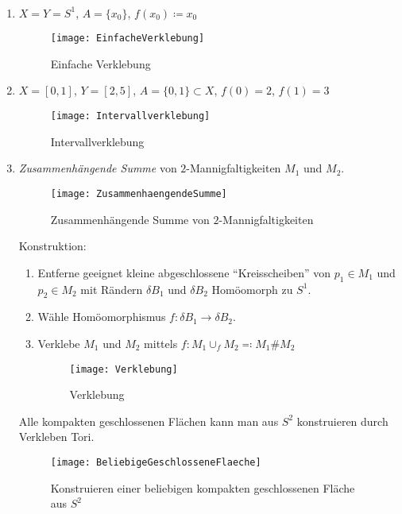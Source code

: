 \begin{example} \
  \begin{enumerate}
    \item \( X = Y = S^1 \), \( A = \{ x_0 \} \), \( f(x_0) \coloneqq x_0 \)
      \begin{figure}[H]
        \texttt{[image: EinfacheVerklebung]}
        \caption{Einfache Verklebung}
      \end{figure}
    \item \( X = [0,1] \), \( Y = [2,5] \), \( A = \{ 0,1 \} \subset X \), \( f(0) = 2 \), \( f(1) = 3 \)
    \begin{figure}[H]
      \texttt{[image: Intervallverklebung]}
      \caption{Intervallverklebung}
    \end{figure}
    \item \emph{Zusammenhängende Summe} von \( 2 \)-Mannigfaltigkeiten \( M_1 \) und \( M_2 \).
      \begin{figure}[H]
        \texttt{[image: ZusammenhaengendeSumme]}
        \caption{Zusammenhängende Summe von \( 2 \)-Mannigfaltigkeiten}
      \end{figure}
      Konstruktion:
      \begin{enumerate}
        \item Entferne geeignet kleine abgeschlossene ``Kreisscheiben'' von \( p_1 \in M_1 \) und \( p_2 \in M_2 \) mit Rändern \( \delta B_1 \) und \( \delta B_2 \) Homöomorph zu \( S^1 \).
        \item Wähle Homöomorphismus \( f: \delta B_1 \to \delta B_2 \).
        \item Verklebe \( M_1 \) und \( M_2 \) mittels \( f : M_1 \cup_f M_2 \eqqcolon M_1 \# M_2 \)
        \begin{figure}[H]
          \texttt{[image: Verklebung]}
          \caption{Verklebung}
        \end{figure}
      \end{enumerate}
      Alle kompakten geschlossenen Flächen kann man aus \( S^2 \) konstruieren durch Verkleben Tori.
      \begin{figure}[H]
        \texttt{[image: BeliebigeGeschlosseneFlaeche]}
        \caption{Konstruieren einer beliebigen kompakten geschlossenen Fläche aus \( S^2 \)}
      \end{figure}
  \end{enumerate}
\end{example}

